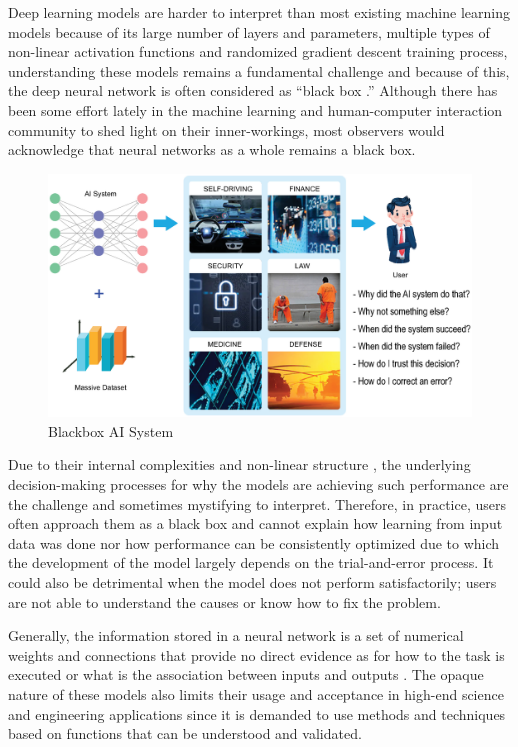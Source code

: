Deep learning models are harder to interpret than most existing machine learning models \cite{Kahng2018} because of its large number of layers and parameters, multiple types of non-linear activation functions and randomized gradient descent training process, understanding these models remains a fundamental challenge and because of this, the deep neural network is often considered as “black box \cite{dlvwz}.” Although there has been some effort lately in the machine learning and human-computer interaction community to shed light on their inner-workings, most observers would acknowledge that neural networks as a whole remains a black box.

\begin{figure}[htbp]
\centering
\includegraphics[width=1\textwidth]{images/Blackbox-AI-copy.eps}
\caption{Blackbox AI System}
\label{fig:Blackbox AI system}
\end{figure}

Due to their internal complexities and non-linear structure \cite{Samek}, the underlying decision-making processes for why the models are achieving such performance are the challenge and sometimes mystifying to interpret. Therefore, in practice, users often approach them as a black box and cannot explain how learning from input data was done nor how performance can be consistently optimized due to which the development of the model largely depends on the trial-and-error process. It could also be detrimental when the model does not perform satisfactorily; users are not able to understand the causes or know how to fix the problem. 

Generally, the information stored in a neural network is a set of numerical weights and connections that provide no direct evidence as for how to the task is executed or what is the association between inputs and outputs \cite{Tzeng2005}. The opaque nature of these models also limits their usage and acceptance in high-end science and engineering applications since it is demanded to use methods and techniques based on functions that can be understood and validated.

